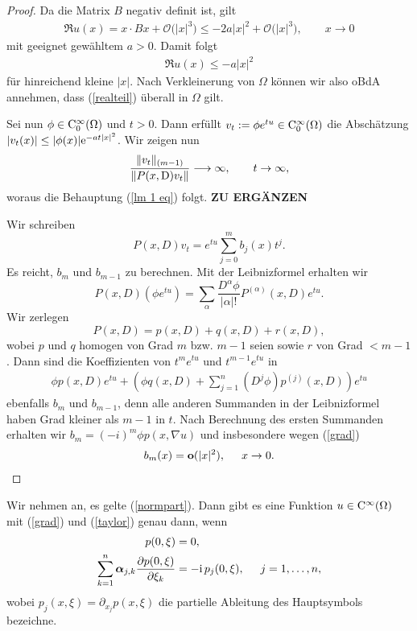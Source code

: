 \begin{proof}
Da die Matrix $B$ negativ definit ist, gilt
\begin{align*}
\Re u(x) = x\cdot Bx + \mathcal O\big(|x|^3\big) \le - 2 a |x|^2 + \mathcal O\big(|x|^3\big),\qquad x\to0
\end{align*}
mit geeignet gewähltem $a>0$. Damit folgt
\begin{align}
\label{realteil}
\Re u(x) \le - a |x|^2 
\end{align}
für hinreichend kleine $|x|$. Nach Verkleinerung von $\Omega$ können wir also oBdA annehmen, dass (\ref{realteil}) überall in $\Omega$ gilt. 

Sei nun $\phi \in \mathrm C_0^\infty(\Omega)$ und $t>0$. Dann erfüllt $v_t := \phi e^{tu} \in \mathrm C_0^\infty(\Omega)$ die Abschätzung $|v_t(x)| \le |\phi(x)| \mathrm e^{-at|x|^2}$. Wir zeigen nun
\[
\frac{\lVert v_t \rVert_{(m-1)}}{\lVert P(x,\mathrm D)v_t \rVert} \longrightarrow \infty, \qquad t \rightarrow \infty,
\]
woraus die Behauptung (\ref{lm 1 eq}) folgt. {\bf ZU ERGÄNZEN} 

Wir schreiben 
\[
P(x,D)v_t = e^{tu} \sum_{j=0}^{m} b_j(x) t^j.
\]
Es reicht, $b_m$ und $b_{m-1}$ zu berechnen. Mit der Leibnizformel erhalten wir
\[
P(x,D)(\phi e^{tu}) = \sum_{\alpha} \dfrac{D^\alpha \phi}{|\alpha|!} P^{(\alpha)}(x,D)e^{tu}.
\]
Wir zerlegen
\[
P(x,D) = p(x,D) + q(x,D) + r(x,D),
\]
wobei $p$ und $q$ homogen von Grad $m$ bzw. $m-1$ seien sowie $r$ von Grad $<m-1$. Dann sind die Koeffizienten von $t^m e^{tu}$ und $t^{m-1} e^{tu}$ in
\begin{align}
\phi p(x,D)e^{tu} + \left( \phi q(x,D) + \sum_{j=1}^{n} (D^j \phi) p^{(j)}(x,D) \right) e^{tu}
\end{align}
ebenfalls $b_m$ und $b_{m-1}$, denn alle anderen Summanden in der Leibnizformel haben Grad kleiner als $m-1$ in $t$. Nach Berechnung des ersten Summanden erhalten wir $b_m = (-i)^m \phi p(x,\nabla u)$ und insbesondere wegen (\ref{grad})
\begin{align}
b_m(x) = \textbf{o} (|x|^2), \hspace{0.5cm} x \rightarrow 0.
\end{align}
\end{proof}

\begin{lem}\label{lem2}
Wir nehmen an, es gelte (\ref{normpart}). Dann gibt es eine Funktion $u \in \mathrm C^\infty(\Omega)$ mit (\ref{grad}) und (\ref{taylor}) genau dann, wenn
\begin{align}
	\label{4.15}
p(0, \xi) &= 0, \\ 	\label{4.16}
\sum_{k=1}^{n} \boldsymbol\alpha_{j,k}\frac{\partial p(0,\xi)}{\partial \xi_k} &= -\mathrm i\,  p_j(0,\xi), \hspace{0.5cm} j=1, \ldots, n, 
\end{align}
wobei $ p_j(x,\xi) = \partial_{x_j}  p(x,\xi)$ die partielle Ableitung des Hauptsymbols bezeichne.
\end{lem}

